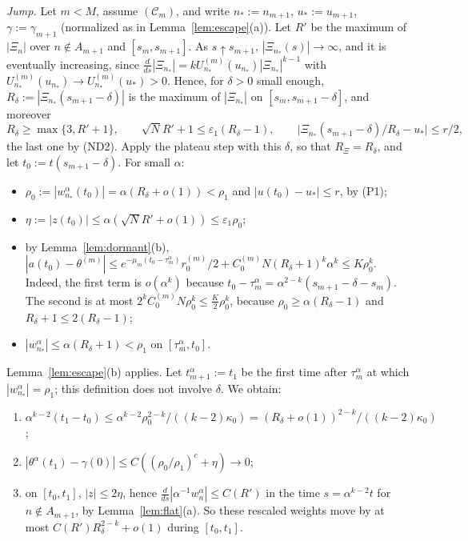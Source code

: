 \documentclass[11pt]{article}
\theoremstyle{definition}
\theoremstyle{remark}
\numberwithin{equation}{section}
\newcommand{\eps}{\varepsilon}
\newcommand{\ND}[1]{\textup{(ND#1)}}
\begin{document}
\emph{Jump.} Let $m<M$, assume $(\mathcal C_m)$, and write $n_*:=n_{m+1}$, $u_*:=u_{m+1}$, $\gamma:=\gamma_{m+1}$ (normalized as in Lemma~\ref{lem:escape}(a)). Let $R'$ be the maximum of $|\Xi_n|$ over $n\notin A_{m+1}$ and $[s_m,s_{m+1}]$. As $s\uparrow s_{m+1}$, $|\Xi_{n_*}(s)|\to\infty$, and it is eventually increasing, since $\frac{d}{ds}|\Xi_{n_*}|=kU^{(m)}_{n_*}(u_{n_*})|\Xi_{n_*}|^{k-1}$ with $U^{(m)}_{n_*}(u_{n_*})\to U^{(m)}_{n_*}(u_*)>0$. Hence, for $\delta>0$ small enough, $R_\delta:=|\Xi_{n_*}(s_{m+1}-\delta)|$ is the maximum of $|\Xi_{n_*}|$ on $[s_m,s_{m+1}-\delta]$, and moreover
\[
R_\delta\ge\max\{3,R'+1\},\qquad \sqrt N R'+1\le\eps_1(R_\delta-1),\qquad \big|\Xi_{n_*}(s_{m+1}-\delta)/R_\delta-u_*\big|\le r/2,
\]
the last one by \ND2. Apply the plateau step with this $\delta$, so that $R_\Xi=R_\delta$, and let $t_0:=t(s_{m+1}-\delta)$. For small $\alpha$:
\begin{itemize}
\item $\rho_0:=|w^\alpha_{n_*}(t_0)|=\alpha(R_\delta+o(1))<\rho_1$ and $|u(t_0)-u_*|\le r$, by (P1);
\item $\eta:=|z(t_0)|\le\alpha(\sqrt NR'+o(1))\le\eps_1\rho_0$;
\item by Lemma~\ref{lem:dormant}(b), $|a(t_0)-\theta^{(m)}|\le e^{-\mu_m(t_0-\tau_m^\alpha)}r_0^{(m)}/2+C_0^{(m)}N(R_\delta+1)^k\alpha^k\le K\rho_0^k$. Indeed, the first term is $o(\alpha^k)$ because $t_0-\tau^\alpha_m=\alpha^{2-k}(s_{m+1}-\delta-s_m)$. The second is at most $2^kC_0^{(m)}N\rho_0^k\le\frac K2\rho_0^k$, because $\rho_0\ge\alpha(R_\delta-1)$ and $R_\delta+1\le2(R_\delta-1)$;
\item $|w^\alpha_{n_*}|\le\alpha(R_\delta+1)<\rho_1$ on $[\tau^\alpha_m,t_0]$.
\end{itemize}
Lemma~\ref{lem:escape}(b) applies. Let $t^\alpha_{m+1}:=t_1$ be the first time after $\tau_m^\alpha$ at which $|w^\alpha_{n_*}|=\rho_1$; this definition does not involve $\delta$. We obtain:
\begin{enumerate}[label=(J\arabic*),leftmargin=3em]
\item $\alpha^{k-2}(t_1-t_0)\le\alpha^{k-2}\rho_0^{2-k}/((k-2)\kappa_0)=(R_\delta+o(1))^{2-k}/((k-2)\kappa_0)$;
\item $|\theta^\alpha(t_1)-\gamma(0)|\le C((\rho_0/\rho_1)^c+\eta)\to0$;
\item on $[t_0,t_1]$, $|z|\le2\eta$, hence $\frac{d}{ds}|\alpha^{-1}w_n^\alpha|\le C(R')$ in the time $s=\alpha^{k-2}t$ for $n\notin A_{m+1}$, by Lemma~\ref{lem:flat}(a). So these rescaled weights move by at most $C(R')R_\delta^{2-k}+o(1)$ during $[t_0,t_1]$.
\end{enumerate}
\end{document}
